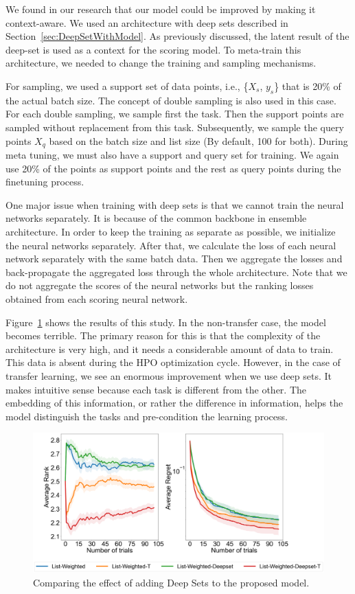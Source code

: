 \documentclass[12pt, twoside, ngerman]{report}
\begin{document}
We found in our research that our model could be improved by making it context-aware. We used an architecture with deep sets described in Section~\ref{sec:DeepSetWithModel}. As previously discussed, the latent result of the deep-set is used as a context for the scoring model. To meta-train this architecture,  we needed to change the training and sampling mechanisms.

For sampling, we used a support set of data points, i.e., \{$X_s$, $y_s$\} that is 20\% of the actual batch size. The concept of double sampling is also used in this case. For each double sampling, we sample first the task.
Then the support points are sampled without replacement from this task.
Subsequently, we sample the query points $X_q$ based on the batch size and list size (By default, 100 for both).
During meta tuning, we must also have a support and query set for training.
We again use 20\% of the points as support points and the rest as query points during the finetuning process.

One major issue when training with deep sets is that we cannot train the neural networks separately.
It is because of the common backbone in ensemble architecture.
In order to keep the training as separate as possible, we initialize the neural networks separately. After that, we calculate the loss of each neural network separately with the same batch data. Then we aggregate the losses and back-propagate the aggregated loss through the whole architecture. Note that we do not aggregate the scores of the neural networks but the ranking losses obtained from each scoring neural network.

Figure~\ref{fig:Q3Ablation} shows the results of this study. In the non-transfer case,  the model becomes terrible. The primary reason for this is that the complexity of the architecture is very high, and it needs a considerable amount of data to train. This data is absent during the HPO optimization cycle. However,  in the case of transfer learning,  we see an enormous improvement when we use deep sets. It makes intuitive sense because each task is different from the other. The embedding of this information, or rather the difference in information, helps the model distinguish the tasks and pre-condition the learning process. 

\begin{figure}[h]
  \centering
    \includegraphics[scale=0.25]{images/Q3Ablation}
    \caption{Comparing the effect of adding Deep Sets to the proposed model.}
    \label{fig:Q3Ablation}
\end{figure}
\end{document}
